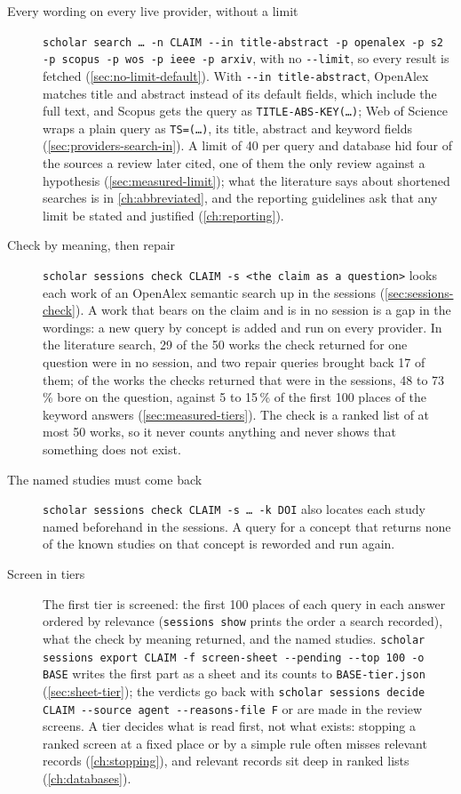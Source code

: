\begin{description}
\item[Every wording on every live provider, without a limit]
  \texttt{scholar search \textquotesingle{}\dots\textquotesingle{} -n CLAIM -{}-in title-abstract -p openalex
  -p s2 -p scopus -p wos -p ieee -p arxiv}, with no \texttt{-{}-limit}, so
  every result is fetched (\cref{sec:no-limit-default}).
  With \texttt{-{}-in title-abstract}, OpenAlex matches title and abstract
  instead of its default fields, which include the full text, and Scopus
  gets the query as \texttt{TITLE-ABS-KEY(\dots)}; Web of Science wraps a
  plain query as \texttt{TS=(\dots)}, its title, abstract and keyword
  fields (\cref{sec:providers-search-in}).
  A limit of 40 per query and database hid four of the sources a review
  later cited, one of them the only review against a hypothesis
  (\cref{sec:measured-limit}); what the literature says about shortened
  searches is in \cref{ch:abbreviated}, and the reporting guidelines ask
  that any limit be stated and justified (\cref{ch:reporting}).

\item[Check by meaning, then repair]
  \texttt{scholar sessions check CLAIM -s \textquotesingle{}<the claim as a question>\textquotesingle{}}
  looks each work of an OpenAlex semantic search up in the sessions
  (\cref{sec:sessions-check}).
  A work that bears on the claim and is in no session is a gap in the
  wordings: a new query by concept is added and run on every provider.
  In the literature search, 29 of the 50 works the check returned for one
  question were in no session, and two repair queries brought back 17 of
  them; of the works the checks returned that were in the sessions, 48 to
  73\,\% bore on the question, against 5 to 15\,\% of the first 100
  places of the keyword answers (\cref{sec:measured-tiers}).
  The check is a ranked list of at most 50 works, so it never counts
  anything and never shows that something does not exist.

\item[The named studies must come back]
  \texttt{scholar sessions check CLAIM -s \textquotesingle{}\dots\textquotesingle{} -k DOI} also locates
  each study named beforehand in the sessions.
  A query for a concept that returns none of the known studies on that
  concept is reworded and run again.

\item[Screen in tiers]
  The first tier is screened: the first 100 places of each query in each
  answer ordered by relevance (\texttt{sessions show} prints the order a
  search recorded), what the check by meaning returned, and the named
  studies.
  \texttt{scholar sessions export CLAIM -f screen-sheet -{}-pending
  -{}-top 100 -o BASE} writes the first part as a sheet and its counts to
  \texttt{BASE-tier.json} (\cref{sec:sheet-tier}); the verdicts go back
  with \texttt{scholar sessions decide CLAIM -{}-source agent
  -{}-reasons-file F} or are made in the review screens.
  A tier decides what is read first, not what exists: stopping a ranked
  screen at a fixed place or by a simple rule often misses relevant
  records (\cref{ch:stopping}), and relevant records sit deep in ranked
  lists (\cref{ch:databases}).


\end{description}
